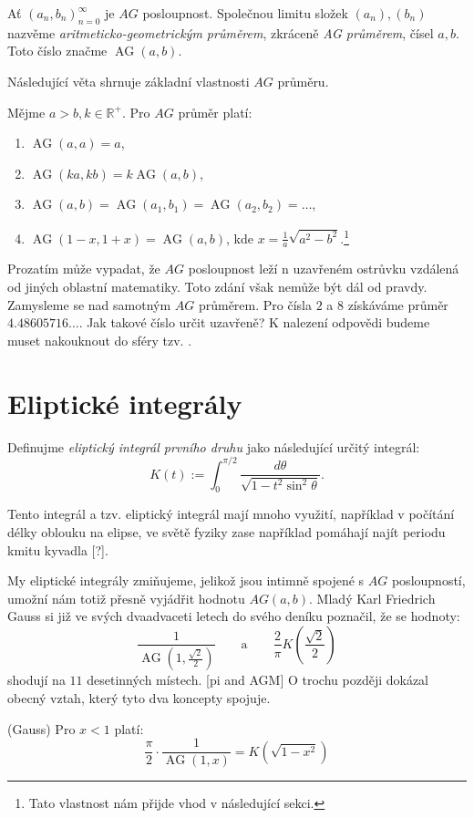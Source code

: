 \documentclass[12pt]{report}
\DeclareMathOperator{\AG}{AG}
\begin{document}
\begin{definice}
Ať $(a_n,b_n)_{n=0}^{\infty}$ je $AG$ posloupnost. Společnou limitu složek $(a_n),(b_n)$ nazvěme \textit{aritmeticko-geometrickým průměrem}, zkráceně \textit{AG průměrem}, čísel $a,b$. Toto číslo značme $\AG(a,b)$.
\end{definice}


Následující věta shrnuje základní vlastnosti $AG$ průměru.


\begin{veta}\label{zkjb}
Mějme $a>b,k \in \mathbb{R}^{+}$. Pro $AG$ průměr platí:
\begin{enumerate}
\item $\AG(a,a) = a$,
\item $\AG(ka,kb) = k \AG (a,b)$,\label{zkjb2}
\item $\AG(a,b) = \AG(a_1,b_1) = \AG(a_2,b_2) = \dots$,
\item $\AG(1-x,1+x) = \AG(a,b)$, kde $x = \frac{1}{a} \sqrt{a^2 - b^2}$.\footnote{Tato vlastnost nám přijde vhod v následující sekci.}
\end{enumerate}
\end{veta}

Prozatím může vypadat, že $AG$ posloupnost leží n uzavřeném ostrůvku vzdálená od jiných oblastní matematiky. Toto zdání však nemůže být dál od pravdy. Zamysleme se nad samotným $AG$ průměrem. Pro čísla $2$ a $8$ získáváme průměr $4.48605716\dots$. Jak takové číslo určit uzavřeně? K nalezení odpovědi budeme muset nakouknout do sféry tzv. .
\section{Eliptické integrály}

\begin{definice}
Definujme \textit{eliptický integrál prvního druhu} jako následující určitý integrál:
\begin{equation*}
K(t) := \int_{0}^{\pi/2} \frac{d \theta}{\sqrt{1 - t^2 \sin^2 \theta}}.
\end{equation*}
\end{definice}

Tento integrál a tzv. eliptický integrál  mají mnoho využití, například v počítání délky oblouku na elipse, ve světě fyziky zase například pomáhají najít periodu kmitu kyvadla [?].

My eliptické integrály zmiňujeme, jelikož jsou intimně spojené s $AG$ posloupností, umožní nám totiž přesně vyjádřit hodnotu $AG(a,b)$. Mladý Karl Friedrich Gauss si již ve svých dvaadvaceti letech do svého deníku poznačil, že se hodnoty:
$$\frac{1}{\AG\left(1,\frac{\sqrt{2}}{2}\right)} \qquad  \text{a} \qquad \frac{2}{\pi} K\left(\frac{\sqrt{2}}{2} \right)$$
shodují na $11$ desetinných místech. [pi and AGM] O trochu později dokázal obecný vztah, který tyto dva koncepty spojuje.
\begin{veta} (Gauss)\label{Ga}
Pro $x<1$ platí:
\begin{equation}\label{el}
\frac{\pi}{2} \cdot \frac{1}{\AG(1,x)} = K\left(\sqrt{1 - x^2}\right)
\end{equation}
\end{veta}
\end{document}
